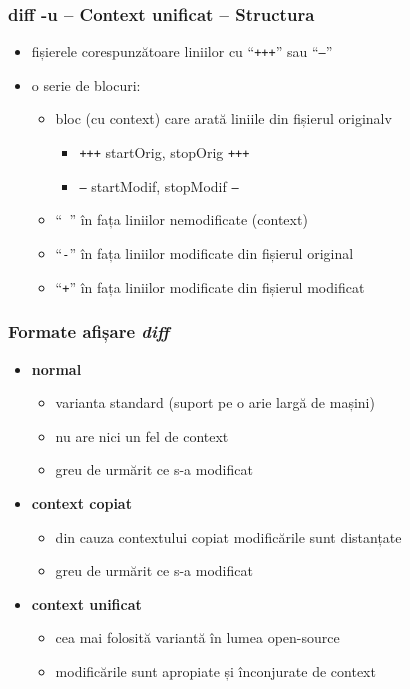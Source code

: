 \documentclass{beamer}
\begin{document}
\begin{frame}
  \frametitle{\textbf{diff -u} – Context unificat – Structura}
  \begin{itemize}
  \item fișierele corespunzătoare liniilor cu ``\texttt{\texttt{+++}}'' sau ``\texttt{---}''
    \item o serie de blocuri:
      \begin{itemize}
      \item bloc (cu context) care arată liniile din fișierul originalv
        \begin{itemize}
        \item \texttt{+++} startOrig, stopOrig \texttt{+++}
        \item \texttt{---} startModif, stopModif \texttt{---}
        \end{itemize}
      \item ``\texttt{ }'' în fața liniilor nemodificate (context)
      \item ``\texttt{-}'' în fața liniilor modificate din fișierul original
      \item ``\texttt{+}'' în fața liniilor modificate din fișierul modificat
      \end{itemize}
  \end{itemize}
\end{frame}

\begin{frame}
  \frametitle{\textbf Formate afișare \textit{diff}}
  \begin{itemize}[<+->]
    \item \textbf{normal}
      \begin{itemize}[<+->]
        \item varianta standard (suport pe o arie largă de mașini)
        \item nu are nici un fel de context
        \item greu de urmărit ce s-a modificat
      \end{itemize}

    \item \textbf{context copiat}
      \begin{itemize}
        \item din cauza contextului copiat modificările sunt distanțate
        \item greu de urmărit ce s-a modificat
      \end{itemize}

    \item \textbf{context unificat}
      \begin{itemize}
        \item cea mai folosită variantă în lumea open-source
        \item modificările sunt apropiate și înconjurate de context
      \end{itemize}
  \end{itemize}
\end{frame}
\end{document}
